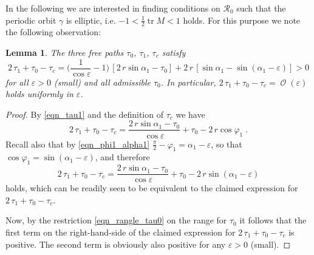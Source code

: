 \documentclass{amsart}
\theoremstyle{plain} %
\newtheorem{lemma}[theorem]{Lemma}
\begin{document}
In the following we are interested in
finding conditions on ${\mathcal R}_0$ such that the periodic orbit $\gamma$
is elliptic, i.e. $-1 < \frac{1}{2} \operatorname{tr} M < 1$ holds. For this purpose
we note the following observation:
\begin{lemma}
  \label{lem_t0_2t1_tc}
  The three free paths $\tau_0$, $\tau_1$, $\tau_c$
  satisfy
  \begin{equation*}
    2\,\tau_1 + \tau_0 - \tau_c
    =
    \Big(\frac{1}{ \cos\varepsilon } - 1 \Big)
    \,[ 2\,r \sin\alpha_1 - \tau_0 ]
    + 2\,r\,[ \sin\alpha_1 - \sin(\alpha_1 - \varepsilon) ]
    >
    0
  \end{equation*}
  for all $\varepsilon>0$ (small) and all admissible $\tau_0$.
  In particular,
  $2\,\tau_1 + \tau_0 - \tau_c = \operatorname{\mathcal{O}}(\varepsilon)$
  holds uniformly in $\varepsilon$.
\end{lemma}
\begin{proof}
  By
  \eqref{eqn_tau1}
  and the definition of $\tau_c$ we have
  \begin{equation*}
    2\,\tau_1 + \tau_0 - \tau_c
    =
    \frac{ 2\,r \sin\alpha_1 - \tau_0 }{ \cos\varepsilon }
    + \tau_0
    - 2\,r\cos\varphi_1
    \;.
  \end{equation*}
  Recall also that by \eqref{eqn_phi1_alpha1}
  $ \frac{\pi}{2} - \varphi_1 = \alpha_1 - \varepsilon $, so that
  $\cos\varphi_1 = \sin(\alpha_1 - \varepsilon)$, and therefore
  \begin{equation*}
    2\,\tau_1 + \tau_0 - \tau_c
    =
    \frac{ 2\,r \sin\alpha_1 - \tau_0 }{ \cos\varepsilon }
    + \tau_0
    - 2\,r \sin(\alpha_1 - \varepsilon)
  \end{equation*}
  holds, which can be readily seen to be equivalent to the claimed
  expression for
  $2\,\tau_1 + \tau_0 - \tau_c$.

  Now, by the restriction \eqref{eqn_rangle_tau0} on the range
  for $\tau_0$ it follows that the first term on the right-hand-side
  of the claimed expression for
  $2\,\tau_1 + \tau_0 - \tau_c$
  is positive. The second term is obviously also positive for
  any $\varepsilon>0$ (small).
\end{proof}
\end{document}
